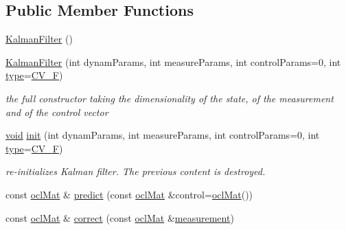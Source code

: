 \subsection*{Public Member Functions}
\begin{DoxyCompactItemize}
\item 
\hyperlink{classcv_1_1ocl_1_1KalmanFilter_a697082a6e3838778a9e28cbd1e309ffa}{Kalman\-Filter} ()
\item 
\hyperlink{classcv_1_1ocl_1_1KalmanFilter_aa3bb8b05ddc0f615a99028aaab7f4120}{Kalman\-Filter} (int dynam\-Params, int measure\-Params, int control\-Params=0, int \hyperlink{imgproc__c_8h_a84612d8738bf935200cf32a103d8efe1}{type}=\hyperlink{core_2types__c_8h_a4a3def5d72b74bed31f5f8ab7676099c}{C\-V\-\_\-F})
\begin{DoxyCompactList}\small\item\em the full constructor taking the dimensionality of the state, of the measurement and of the control vector \end{DoxyCompactList}\item 
\hyperlink{legacy_8hpp_a8bb47f092d473522721002c86c13b94e}{void} \hyperlink{classcv_1_1ocl_1_1KalmanFilter_a219187c47f74eb4a08f00e9024bfc0bd}{init} (int dynam\-Params, int measure\-Params, int control\-Params=0, int \hyperlink{imgproc__c_8h_a84612d8738bf935200cf32a103d8efe1}{type}=\hyperlink{core_2types__c_8h_a4a3def5d72b74bed31f5f8ab7676099c}{C\-V\-\_\-F})
\begin{DoxyCompactList}\small\item\em re-\/initializes Kalman filter. The previous content is destroyed. \end{DoxyCompactList}\item 
const \hyperlink{classcv_1_1ocl_1_1oclMat}{ocl\-Mat} \& \hyperlink{classcv_1_1ocl_1_1KalmanFilter_ab43e949fa7ec874cf4f68820654a8636}{predict} (const \hyperlink{classcv_1_1ocl_1_1oclMat}{ocl\-Mat} \&control=\hyperlink{classcv_1_1ocl_1_1oclMat}{ocl\-Mat}())
\item 
const \hyperlink{classcv_1_1ocl_1_1oclMat}{ocl\-Mat} \& \hyperlink{classcv_1_1ocl_1_1KalmanFilter_a866a13021cedf10b989e04fea963e273}{correct} (const \hyperlink{classcv_1_1ocl_1_1oclMat}{ocl\-Mat} \&\hyperlink{tracking_8hpp_a418553f0076326b269a34730ffa3890f}{measurement})
\end{DoxyCompactItemize}
